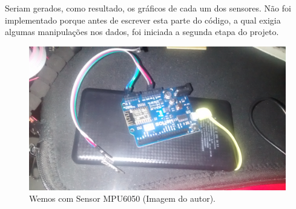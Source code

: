 	Seriam gerados, como resultado, os gráficos de cada um dos sensores. Não foi implementado porque antes de escrever esta parte do código, a qual exigia algumas manipulações nos dados, foi iniciada a segunda etapa do projeto. 
	
	\begin{figure}[h!]
		\centering
		\includegraphics[keepaspectratio=true,scale=0.075]{figuras/wemos1.jpg}
		\caption{Wemos com Sensor MPU6050 (Imagem do autor).}
		
		\label{wemos1}	
	\end{figure}
	
